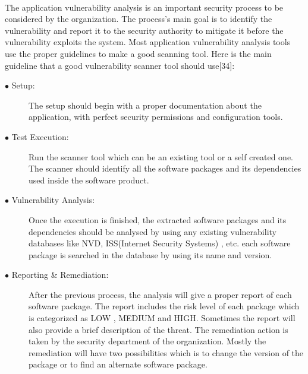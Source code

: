 \paragraph{}
The application vulnerability analysis is an important security process to be considered by the organization. The process's main goal is to identify the vulnerability and report it to the security authority to mitigate it before the vulnerability exploits the system. Most application vulnerability analysis tools use the proper guidelines to make a good scanning tool. Here is the main guideline that a good vulnerability scanner tool should use[34]:
\begin{description}
	\item [$\bullet$ Setup:] The setup should begin with a proper documentation about the application, with perfect security permissions and configuration tools.
	
	\item [$\bullet$ Test Execution:] Run the scanner tool which can be an existing tool or a self created one. The scanner should identify all the software packages and its dependencies used inside the software product.
	
	\item [$\bullet$ Vulnerability Analysis:] Once the execution is finished, the extracted software packages and its dependencies should be analysed by using any existing vulnerability databases like NVD, ISS(Internet Security Systems) , etc. each software package is searched in the database by using its name and version.
	
	\item [$\bullet$ Reporting \& Remediation:] After the previous process, the analysis will give a proper report of each software package. The report includes the risk level of each package which is categorized as LOW , MEDIUM and  HIGH. Sometimes the report will also provide a brief description of the threat. The remediation action is taken by the security department of the organization. Mostly the remediation will have two possibilities which is to change the version of the package or to find an alternate software package.
\end{description}
